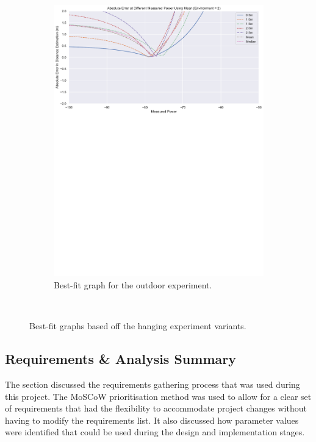 \documentclass{l4proj}
\begin{document}
\begin{figure}[!htb]
\begin{subfigure}[b]{0.45\textwidth}
        \includegraphics[width=\textwidth]{images/outdoor_hanging_bestfit.pdf}
        \caption{ Best-fit graph for the outdoor experiment. }
        \label{fig:outdoor_hanging_bestfit}
    \end{subfigure}
    ~ %
    \caption{ Best-fit graphs based off the hanging experiment variants. }
    \label{fig:bestfit_plots}
\end{figure}

\subsection{Requirements \& Analysis Summary}

The section discussed the requirements gathering process that was used during this project. The MoSCoW prioritisation method was used to allow for a clear set of requirements that had the flexibility to accommodate project changes without having to modify the requirements list. It also discussed how parameter values were identified that could be used during the design and implementation stages.
\end{document}

